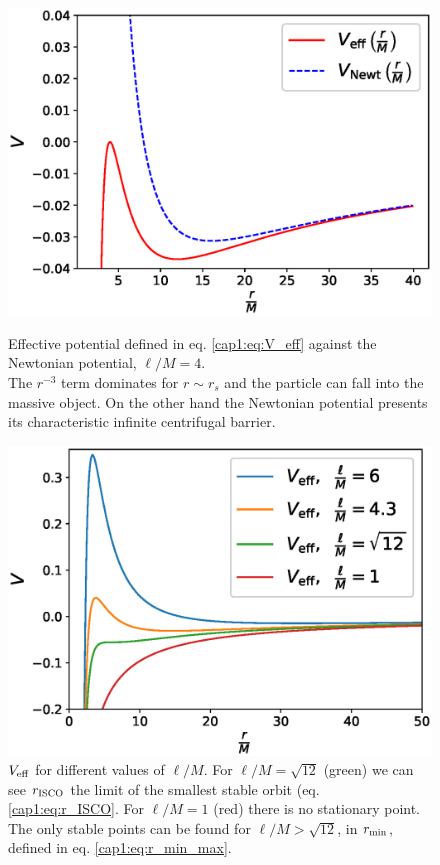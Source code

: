 \begin{figure}[h]
\begin{minipage}{0.49 \textwidth}
    \centering
    \includegraphics[width = \textwidth]{Figures/chapter1/V_eff.eps}
    \caption{Effective potential defined in eq. \ref{cap1:eq:V_eff} against the
    Newtonian potential, $\ell / M = 4$. \\
    The $r^{-3}$ term dominates for $r \sim r_s$ and the
    particle can fall into the massive object.
    On the other hand the Newtonian potential presents its characteristic
    infinite centrifugal barrier.}
    \label{cap1:fig:V_effvsVN}
\end{minipage}
\hspace{0.009 \textwidth}
\begin{minipage}{0.49 \textwidth}
    \centering
    \includegraphics[width = \textwidth]{Figures/chapter1/V_eff_tanti.eps}
    \caption{$V_{\rm eff}$ for different values of $\ell / M$.
    For $\ell / M = \sqrt{12}$ (green) we can see $r_{\rm ISCO}$
    the limit of the smallest stable orbit (eq. \ref{cap1:eq:r_ISCO}.
    For $\ell / M = 1$ (red) there is no stationary point.
    The only stable points can be found for $\ell / M > \sqrt{12}$,
    in $r_{\rm min}$, defined in eq. \ref{cap1:eq:r_min_max}.}
    \label{cap1:fig:V_eff_tanti}
\end{minipage}
\end{figure}

